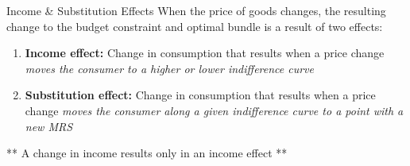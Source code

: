 \documentclass[compress]{beamer}
\begin{document}
\begin{frame}{Income \& Substitution Effects}
    When the price of goods changes, the resulting change to the budget constraint and optimal bundle is a result of two effects:
    \begin{enumerate}
        \item \textbf{Income effect:} Change in consumption that results when a price change \textit{moves the consumer to a higher or lower indifference curve}
        \item \textbf{Substitution effect:} Change in consumption that results when a price change \textit{moves the consumer along a given indifference curve to a point with a new MRS}
    \end{enumerate}

    \vspace{4mm}

\begin{center}
    ** A change in income results only in an income effect **
    \end{center}
\end{frame}
\end{document}
